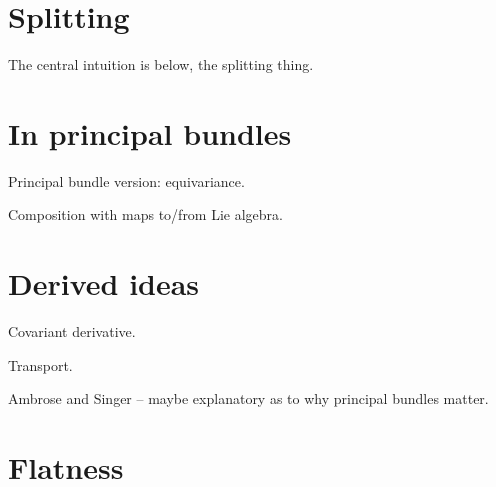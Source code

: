 \documentclass[12pt]{article}
\begin{document}
\section{Splitting}
The central intuition is below, the splitting thing.

\section{In principal bundles}
Principal bundle version: equivariance.

Composition with maps to/from Lie algebra.

\section{Derived ideas}
Covariant derivative.

Transport.

Ambrose and Singer -- maybe explanatory as to why principal bundles matter.

\section{Flatness}



\end{document}
